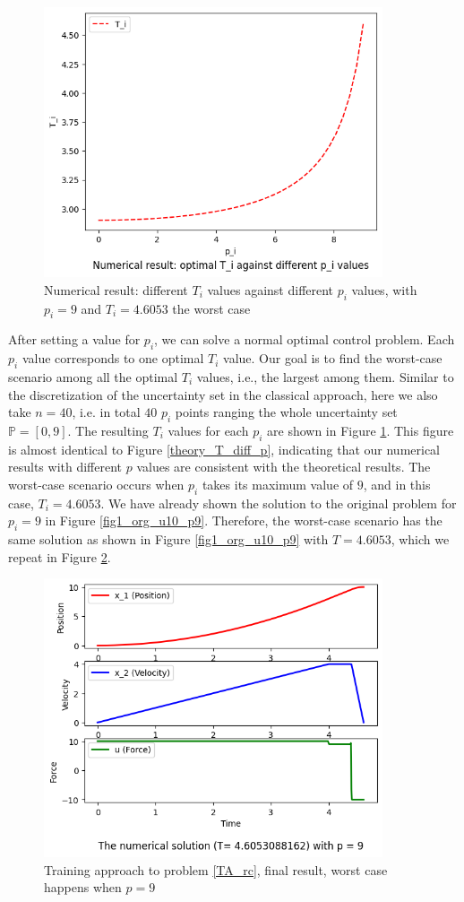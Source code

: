\documentclass  [
  paper    = a4,
  BCOR     = 10mm,
  twoside,
  fontsize = 12pt,
  fleqn,
  toc      = bibnumbered,
  toc      = listofnumbered,
  numbers  = noendperiod,
  headings = normal,
  listof   = leveldown,
  version  = 3.03
]                                       {scrreprt}
\newcommand{\<}{\langle}
\renewcommand{\>}{\rangle}
\begin{document}
\begin{figure}[H]
	\centerline{\includegraphics[width=10cm]{numerical_T_p.png}}
	\caption{Numerical result: different $T_i$ values against different $p_i$ values, with $p_i=9$ and  $T_i=4.6053$ the worst case}
	\label{fig_ta_numerical_T_p}
\end{figure}

After setting a value for $p_i$, we can solve a normal optimal control problem. Each $p_i$ value corresponds to one optimal $T_i$ value. Our goal is to find the worst-case scenario among all the optimal $T_i$ values, i.e., the largest among them. Similar to the discretization of the uncertainty set in the classical approach, here we also take $n=40$, i.e. in total $40$ $p_i$ points ranging the whole uncertainty set $\mathbb{P}=[0,9]$.  The resulting $T_i$ values for each $p_i$ are shown in Figure \ref{fig_ta_numerical_T_p}. This figure is almost identical to Figure \ref{theory_T_diff_p}, indicating that our numerical results with different $p$ values are consistent with the theoretical results. The worst-case scenario occurs when $p_i$ takes its maximum value of $9$, and in this case, $T_i=4.6053$. We have already shown the solution to the original problem for $p_i=9$ in Figure \ref{fig1_org_u10_p9}. Therefore, the worst-case scenario has the same solution as shown in Figure \ref{fig1_org_u10_p9} with $T=4.6053$, which we repeat in Figure \ref{fig1_ta_final}.

\begin{figure}[h]
	\centerline{\includegraphics[width=10cm]{original_u10_p9.png}}
	\caption{Training approach to problem \ref{TA_rc}, final result, worst case happens when $p=9$}
	\label{fig1_ta_final}
\end{figure}
\end{document}
